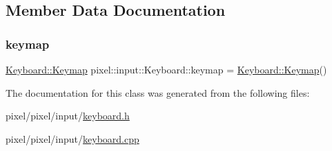\subsection{Member Data Documentation}
\mbox{\label{classpixel_1_1input_1_1_keyboard_ac0044c74f811cec7f45dd36038982725}} 
\subsubsection{\texorpdfstring{keymap}{keymap}}
{\footnotesize\ttfamily \hyperlink{classpixel_1_1input_1_1_keyboard_a9c2e61fefeba656cf2eb1adfccacc58a}{Keyboard\+::\+Keymap} pixel\+::input\+::\+Keyboard\+::keymap = \hyperlink{classpixel_1_1input_1_1_keyboard_a9c2e61fefeba656cf2eb1adfccacc58a}{Keyboard\+::\+Keymap}()\hspace{0.3cm}{\ttfamily [static]}}



The documentation for this class was generated from the following files\+:\begin{DoxyCompactItemize}
\item 
pixel/pixel/input/\hyperlink{keyboard_8h}{keyboard.\+h}\item 
pixel/pixel/input/\hyperlink{keyboard_8cpp}{keyboard.\+cpp}\end{DoxyCompactItemize}
